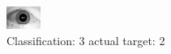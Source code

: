 \begin{figure}[h!]
\begin{center}
\includegraphics[width=0.60\columnwidth]{figures/ID1791_class_3_target_2.png}
\end{center}
\caption{ Classification: 3 actual target: 2}
\label{fig:ID1791_class_3_target_2}
\end{figure}
